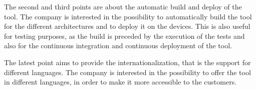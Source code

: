 The second and third points are about the automatic build and deploy of the tool. The company is interested in the possibility to automatically build the tool for the different architectures and to deploy it on the devices. This is also useful for testing purposes, as the build is preceded by the execution of the tests and also for the continuous integration and continuous deployment of the tool.

The latest point aims to provide the internationalization, that is the support for different languages. The company is interested in the possibility to offer the tool in different languages, in order to make it more accessible to the customers.



